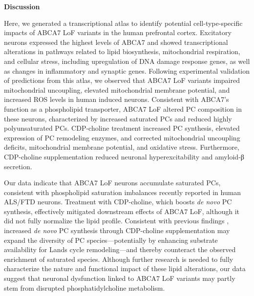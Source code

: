 \textbf{Discussion}\newline\newline

Here, we generated a transcriptional atlas to identify potential cell-type-specific impacts of ABCA7 LoF variants in the human prefrontal cortex. Excitatory neurons expressed the highest levels of ABCA7 and showed transcriptional alterations in pathways related to lipid biosynthesis, mitochondrial respiration, and cellular stress, including upregulation of DNA damage response genes, as well as changes in inflammatory and synaptic genes. Following experimental validation of predictions from this atlas, we observed that ABCA7 LoF variants impaired mitochondrial uncoupling, elevated mitochondrial membrane potential, and increased ROS levels in human induced neurons. Consistent with ABCA7's function as a phospholipid transporter, ABCA7 LoF altered PC composition in these neurons, characterized by increased saturated PCs and reduced highly polyunsaturated PCs. CDP-choline treatment increased PC synthesis, elevated expression of PC remodeling enzymes, and corrected mitochondrial uncoupling deficits, mitochondrial membrane potential, and oxidative stress. Furthermore, CDP-choline supplementation reduced neuronal hyperexcitability and amyloid-β secretion. 

Our data indicate that ABCA7 LoF neurons accumulate saturated PCs, consistent with phospholipid saturation imbalances recently reported in human ALS/FTD neurons\supercite{Giblin2025-ri}. Treatment with CDP-choline, which boosts \textit{de novo} PC synthesis, effectively mitigated downstream effects of ABCA7 LoF, although it did not fully normalize the lipid profile. Consistent with previous findings \supercite{Boumann2003-im}, increased \textit{de novo} PC synthesis through CDP-choline supplementation may expand the diversity of PC species—potentially by enhancing substrate availability for Lands cycle remodeling—and thereby counteract the observed enrichment of saturated species. Although further research is needed to fully characterize the nature and functional impact of these lipid alterations, our data suggest that neuronal dysfunction linked to ABCA7 LoF variants may partly stem from disrupted phosphatidylcholine metabolism.

